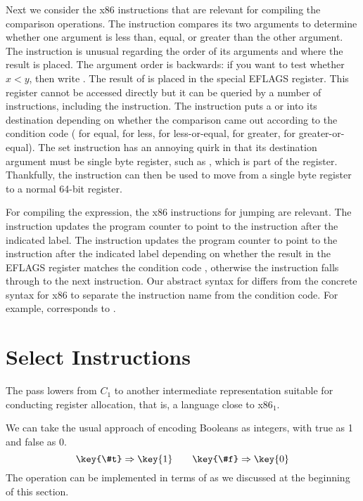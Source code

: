 \documentclass[11pt]{book}
\begin{document}
Next we consider the x86 instructions that are relevant for
compiling the comparison operations. The  instruction
compares its two arguments to determine whether one argument is less
than, equal, or greater than the other argument. The 
instruction is unusual regarding the order of its arguments and where
the result is placed. The argument order is backwards: if you want to
test whether $x < y$, then write . The result of
 is placed in the special EFLAGS register. This register
cannot be accessed directly but it can be queried by a number of
instructions, including the  instruction. The 
instruction puts a  or  into its destination depending
on whether the comparison came out according to the condition code
 ( for equal,  for less,  for
less-or-equal,  for greater,  for greater-or-equal).
The set instruction has an annoying quirk in that its destination
argument must be single byte register, such as , which is
part of the  register.  Thankfully, the 
instruction can then be used to move from a single byte register to a
normal 64-bit register.

For compiling the  expression, the x86 instructions for
jumping are relevant. The  instruction updates the program
counter to point to the instruction after the indicated label.  The
 instruction updates the program counter to point to the
instruction after the indicated label depending on whether the result
in the EFLAGS register matches the condition code , otherwise
the  instruction falls through to the next
instruction. Our abstract syntax for  differs from the
concrete syntax for x86 to separate the instruction name from the
condition code. For example,  corresponds to
.

\section{Select Instructions}
\label{sec:select-r2}

The  pass lowers from $C_1$ to another
intermediate representation suitable for conducting register
allocation, that is, a language close to x86$_1$.

We can take the usual approach of encoding Booleans as integers, with
true as 1 and false as 0.
\[
\key{\#t} \Rightarrow \key{1}
\qquad
\key{\#f} \Rightarrow \key{0}
\]
The  operation can be implemented in terms of 
as we discussed at the beginning of this section.
\end{document}
